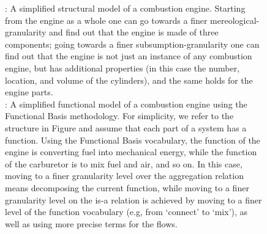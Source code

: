 \documentclass[
]{ceurart}
\begin{document}
\begin{figure}
\begin{subfigure}{0.49\textwidth}
    \caption{}
    \label{fig:2-ways-granularity-table-function}
    \end{subfigure}
\caption{: A simplified structural model of a combustion engine. Starting from the engine as a whole one can go towards a finer mereological-granularity and find out that the engine is made of three components; going towards a finer subsumption-granularity one can find out that the engine is not just an instance of any combustion engine, but has additional properties (in this case the number, location, and volume of the cylinders), and the same holds for the engine parts. \\
: A simplified functional model of a combustion engine using the Functional Basis methodology. For simplicity, we refer to the structure in Figure  and assume that each part of a system has a function. Using the Functional Basis vocabulary, the function of the engine is converting fuel into mechanical energy, while the function of the carburetor is to mix fuel and air, and so on. In this case, moving to a finer granularity level over the aggregation relation means decomposing the current function, while moving to a finer granularity level on the is-a relation is achieved by moving to a finer level of the function vocabulary (e.g, from `connect' to `mix'), as well as using more precise terms for the flows.}
\label{fig:due-figure}
\end{figure}



\end{document}
